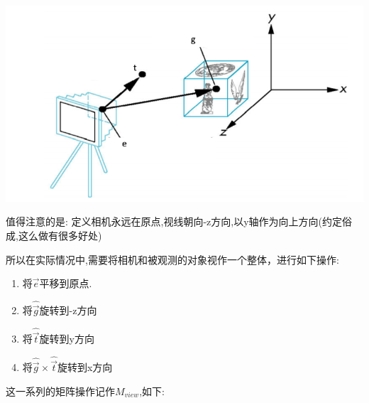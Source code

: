\documentclass[UTF8,12pt]{ctexbook}
\begin{document}
{{{{\begin{itemize}
{                \includegraphics[scale=0.9]{resources/viewTransformation.png}

                值得注意的是: 定义相机永远在原点,视线朝向-z方向,以y轴作为向上方向(约定俗成,这么做有很多好处)

                所以在实际情况中,需要将相机和被观测的对象视作一个整体，进行如下操作:
                \begin{enumerate}
                  \item 将$\vec{e}$平移到原点.
                  \item 将$\hat{\vec{g}}$旋转到-z方向
                  \item 将$\hat{\vec{t}}$旋转到y方向
                  \item 将$\hat{\vec{g}} \times \hat{\vec{t}}$旋转到x方向
                \end{enumerate}

                这一系列的矩阵操作记作$M_{view}$,如下:

}
\end{itemize}}}}}
\end{document}
